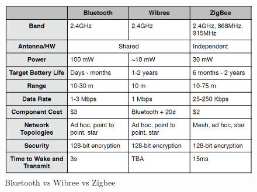 \begin{figure}[!h] 
    \centering 
    \includegraphics[scale = 0.3]{images/bluetooth-vs-zigbee-vs-wibree.png} 
    \caption{Bluetooth vs Wibree vs Zigbee}
    \label{bluetooth-vs-zigbee-vs-wibree}
\end{figure}